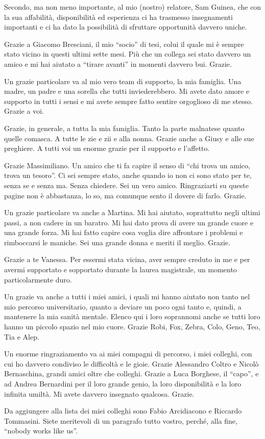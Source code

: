 Secondo, ma non meno importante, al mio (nostro) relatore, Sam Guinea, che con la sua affabilità, disponibilità ed esperienza ci ha trasmesso insegnamenti importanti e ci ha dato la possibilità di sfruttare opportunità davvero uniche.

Grazie a Giacomo Bresciani, il mio ``socio'' di tesi, colui il quale mi è sempre stato vicino in questi ultimi sette mesi. Più che un collega sei stato davvero un amico e mi hai aiutato a ``tirare avanti'' in momenti davvero bui. Grazie.

Un grazie particolare va al mio vero team di supporto, la mia famiglia. Una madre, un padre e una sorella che tutti inviederebbero. Mi avete dato amore e supporto in tutti i sensi e mi avete sempre fatto sentire orgoglioso di me stesso. Grazie a voi.

Grazie, in generale, a tutta la mia famiglia. Tanto la parte malnatese quanto quelle comasca. A tutte le zie e zii e alla nonna. Grazie anche a Giusy e alle sue preghiere. A tutti voi un enorme grazie per il supporto e l'affetto.

Grazie Massimiliano. Un amico che ti fa capire il senso di ``chi trova un amico, trova un tesoro''. Ci sei sempre stato, anche quando io non ci sono stato per te, senza se e senza ma. Senza chiedere. Sei un vero amico. Ringraziarti su queste pagine non è abbastanza, lo so, ma comunque sento il dovere di farlo. Grazie.

Un grazie particolare va anche a Martina. Mi hai aiutato, soprattutto negli ultimi passi, a non cadere in un baratro. Mi hai dato prova di avere un grande cuore e una grande forza. Mi hai fatto capire cosa voglia dire affrontare i problemi e rimboccarsi le maniche. Sei una grande donna e meriti il meglio. Grazie.

Grazie a te Vanessa. Per essermi stata vicina, aver sempre creduto in me e per avermi supportato e sopportato durante la laurea magistrale, un momento particolarmente duro.

Un grazie va anche a tutti i miei amici, i quali mi hanno aiutato non tanto nel mio percorso universitario, quanto a deviare un poco ogni tanto e, quindi, a mantenere la mia sanità mentale. Elenco qui i loro soprannomi anche se tutti loro hanno un piccolo spazio nel mio cuore. Grazie Robi, Fox, Zebra, Colo, Geno, Teo, Tia e Alep.

Un enorme ringraziamento va ai miei compagni di percorso, i miei colleghi, con cui ho davvero condiviso le difficoltà e le gioie. Grazie Alessandro Coltro e Nicolò Bernaschina, grandi amici oltre che colleghi. Grazie a Luca Borghese, il ``capo'', e ad Andrea Bernardini per il loro grande genio, la loro disponibilità e la loro infinita umiltà. Mi avete davvero insegnato qualcosa. Grazie.

Da aggiungere alla lista dei miei colleghi sono Fabio Arcidiacono e Riccardo Tommasini. Siete meritevoli di un paragrafo tutto vostro, perché, alla fine, ``nobody works like us''.